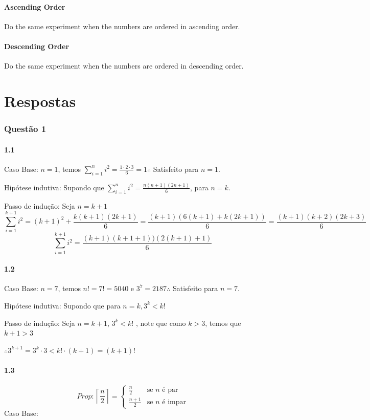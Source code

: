 \documentclass{article}
\begin{document}
\subsection{Ascending Order}
Do the same experiment when the numbers are ordered in ascending order.

\subsection{Descending Order}
Do the same experiment when the numbers are ordered in descending order.

\pagebreak
\part*{Respostas}

\section*{Questão 1}
\subsection*{1.1}
Caso Base: $n = 1$, temos $\sum^{n}_{i=1}{i^2}= \frac{1\cdot2\cdot3}{6}=1 \therefore$ Satisfeito para $n = 1$.

Hipótese indutiva: Supondo que $\sum^{n}_{i=1}{i^2} =\frac{n(n+1)(2n+1)}{6}$, para $n = k$.

Passo de indução: Seja $n = k + 1$
$$\sum^{k+1}_{i=1}{i^2} = (k+1)^2 + \frac{k(k+1)(2k+1)}{6} =
\frac{(k+1)(6(k+1) + k(2k + 1))}{6} = \frac{(k+1)(k+2)(2k +3)}{6} 
$$
$$
\sum^{k+1}_{i=1}{i^2} = \frac{(k+1)(k+1+1))(2(k+1)+1)}{6}
$$

\subsection*{1.2}
Caso Base: $n = 7$, temos $n! = 7! = 5040$ e $3^7 = 2187 \therefore$ Satisfeito para $n = 7$.

Hipótese indutiva: Supondo que para $n=k, 3^k < k!$

Passo de indução: Seja $n = k + 1$, $3^k < k!$
, note que como $k>3$, temos que $k+1>3$

$\therefore 3^{k+1}=3^k\cdot3 < k!\cdot(k+1)=(k+1)!$


\subsection*{1.3}
  \[Prop:
    \left \lceil\frac{n}{2} \right \rceil=
    \left\{
    \begin{array}{ll}
    \frac{n}{2}& \textrm{se $n$ é par}\\
    \frac{n+1}{2}& \textrm{se $n$ é impar}
    \end{array}
    \right.
  \]
Caso Base: 
\end{document}
